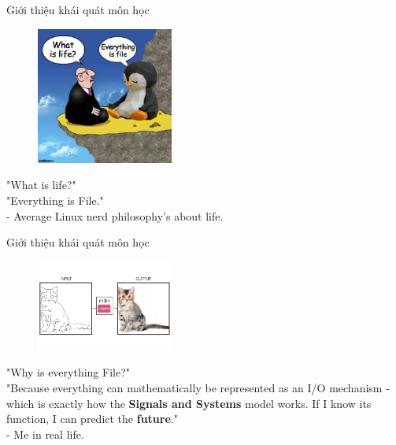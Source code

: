 \documentclass[8pt]{beamer}
\begin{document}
\begin{frame}{Giới thiệu khái quát môn học}
\begin{figure} %
    \centering
    \includegraphics[width=0.4\textwidth]{linux.jpg}
\end{figure}
"What is life?" \\"Everything is File." \\ - Average Linux nerd philosophy's about life.
\end{frame}
\begin{frame}{Giới thiệu khái quát môn học}
\begin{figure}
	\centering
	\includegraphics[width=0.4\textwidth]{cat.jpg}
\end{figure}
"Why is everything File?"
\\ "Because everything can mathematically be represented as an I/O mechanism - which is exactly how the \textbf{Signals and Systems} model works. If I know its function, I can predict the \textbf{future}."
\\ - Me in real life.
\end{frame}
\end{document}
